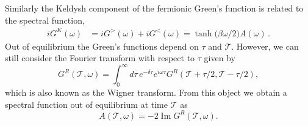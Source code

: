 \documentclass[prx,aps,onecolumn,amsfonts,showpacs,superscriptaddress,preprint,eqsecnum]
{revtex4-1}
\begin{document}
Similarly the Keldysh component of the fermionic Green's function is related to the spectral 
function,
\begin{equation}
\begin{split}
	iG^K(\omega) &= iG^>(\omega) + iG^<(\omega) = \operatorname{tanh}\bigl(\beta \omega / 2\bigr) A(\omega) \,.
	\label{eq:GK_A}
\end{split}
\end{equation}
Out of equilibrium the Green's functions depend on $\tau$ and $\mathcal{T}$. However, we can still 
consider the Fourier transform with respect to $\tau$ given by
\begin{equation}
	 G^R(\mathcal{T}, \omega) = \int_{0}^{\infty} d\tau \,  e^{-\delta \tau} e^{i\omega \tau}  G^R(\mathcal{T} + \tau/2, \mathcal{T} - \tau/2), \label{eq:GRWigner}
\end{equation}
which is also known as the Wigner transform. From this object we obtain a spectral function out of equilibrium at time $\mathcal{T}$ as
\begin{equation}
	A(\mathcal{T}, \omega) = -2 \operatorname{Im}  G^R(\mathcal{T}, \omega). \label{eq:spectral}
\end{equation}
\end{document}
